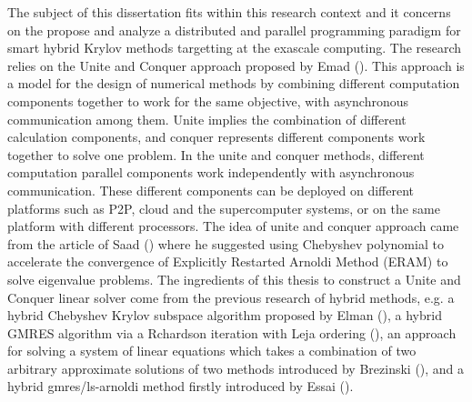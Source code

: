 The subject of this dissertation fits within this research context and it concerns on the propose and analyze a distributed and parallel programming paradigm for smart hybrid Krylov methods targetting at the exascale computing. The research relies on the Unite and Conquer approach proposed by Emad (\cite{emad2016unite}). This approach is a model for the design of numerical methods by combining different computation components together to work for the same objective, with asynchronous communication among them. Unite implies the combination of different calculation components, and conquer represents different components work together to solve one problem. In the unite and conquer methods, different computation parallel components work independently with asynchronous communication. These different components can be deployed on different platforms such as P2P, cloud and the supercomputer systems, or on the same platform with different processors. The idea of unite and conquer approach came from the article of Saad (\cite{saad1984chebyshev}) where he suggested using Chebyshev polynomial to accelerate the convergence of Explicitly Restarted Arnoldi Method (ERAM) to solve eigenvalue problems. The ingredients of this thesis to construct a Unite and Conquer linear solver come from the previous research of hybrid methods, e.g. a hybrid Chebyshev Krylov subspace algorithm proposed by Elman (\cite{elman1986hybrid}), a hybrid GMRES algorithm via a Rchardson iteration with Leja ordering (\cite{nachtigal1992hybrid}), an approach for solving a system of linear equations which takes a combination of two arbitrary approximate solutions of two methods introduced by Brezinski (\cite{brezinski1994hybrid}), and a hybrid gmres/ls-arnoldi method firstly introduced by Essai (\cite{essai1999heterogeneous}).

